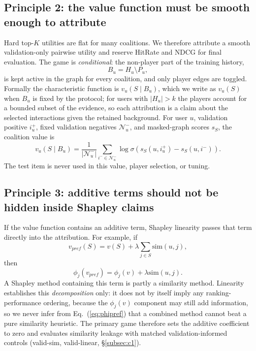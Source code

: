 \documentclass[pdflatex,sn-mathphys-num]{sn-jnl}
\begin{document}
\subsection{Principle 2: the value function must be smooth enough to attribute}\label{subsec:principle_value}

Hard top-$K$ utilities are flat for many coalitions. We therefore attribute a smooth validation-only pairwise utility and reserve HitRate and NDCG for final evaluation.
The game is \emph{conditional}: the non-player part of the training history,
\begin{equation}\label{eq:background}
B_u = H_u\setminus P_u,
\end{equation}
is kept active in the graph for every coalition, and only player edges are toggled. Formally the characteristic function is $v_u(S\mid B_u)$, which we write as $v_u(S)$ when $B_u$ is fixed by the protocol; for users with $|H_u|>k$ the players account for a bounded subset of the evidence, so each attribution is a claim about the selected interactions given the retained background. For user $u$, validation positive $i_u^+$, fixed validation negatives $\mathcal{N}_u^-$, and masked-graph scores $s_S$, the coalition value is
\begin{equation}\label{eq:pairwise}
v_u(S\mid B_u)=\frac{1}{|\mathcal{N}_u^-|}\sum_{i^-\in\mathcal{N}_u^-}\log\sigma\!\left(s_S(u,i_u^+)-s_S(u,i^-)\right).
\end{equation}
The test item is never used in this value, player selection, or tuning.

\subsection{Principle 3: additive terms should not be hidden inside Shapley claims}\label{subsec:principle_additive}

If the value function contains an additive term, Shapley linearity passes that term directly into the attribution. For example, if
\begin{equation}\label{eq:vpref}
v_{pref}(S)=v(S)+\lambda\sum_{j\in S}\mathrm{sim}(u,j),
\end{equation}
then
\begin{equation}\label{eq:phipref}
\phi_j(v_{pref})=\phi_j(v)+\lambda\mathrm{sim}(u,j).
\end{equation}
A Shapley method containing this term is partly a similarity method. Linearity establishes this \emph{decomposition} only: it does not by itself imply any ranking-performance ordering, because the $\phi_j(v)$ component may still add information, so we never infer from Eq.~(\ref{eq:phipref}) that a combined method cannot beat a pure similarity heuristic. The primary game therefore sets the additive coefficient to zero and evaluates similarity leakage with matched validation-informed controls (valid-sim, valid-linear, \S\ref{subsec:c1}).
\end{document}

